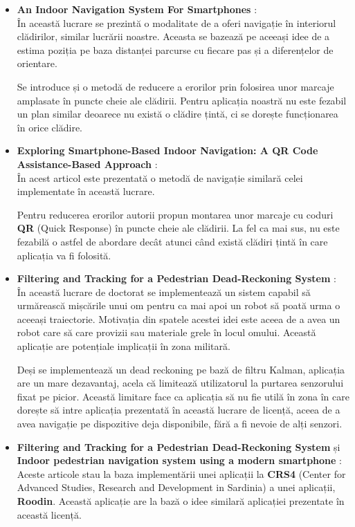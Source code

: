 \documentclass[12pt,a4paper]{article}
\begin{document}
\begin{itemize}
\item \textbf{An Indoor Navigation System For Smartphones} \cite{AbhijitChandgadkar}:\\
În această lucrare se prezintă o modalitate de a oferi navigație în interiorul clădirilor, similar lucrării noastre. Aceasta se bazează pe aceeași idee de a estima poziția pe baza distanței parcurse cu fiecare pas și a diferențelor de orientare. 

Se introduce și o metodă de reducere a erorilor prin folosirea unor marcaje amplasate în puncte cheie ale clădirii. Pentru aplicația noastră nu este fezabil un plan similar deoarece nu există o clădire țintă, ci se dorește funcționarea în orice clădire.

\item \textbf{Exploring Smartphone-Based Indoor Navigation: A QR Code Assistance-Based Approach} \cite{QRNavigation}:\\
În acest articol este prezentată o metodă de navigație similară celei implementate în această lucrare. 

Pentru reducerea erorilor autorii propun montarea unor marcaje cu coduri \textbf{QR} (Quick Response) în puncte cheie ale clădirii. La fel ca mai sus, nu este fezabilă o astfel de abordare decât atunci când există clădiri țintă în care aplicația va fi folosită.

\item \textbf{Filtering and Tracking for a Pedestrian Dead-Reckoning System} \cite{SuratKwanmuang}:\\
În această lucrare de doctorat se implementează un sistem capabil să urmărească mișcările unui om pentru ca mai apoi un robot să poată urma o aceeași traiectorie. Motivația din spatele acestei idei este aceea de a avea un robot care să care provizii sau materiale grele în locul omului. Această aplicație are potențiale implicații în zona militară.

Deși se implementează un dead reckoning pe bază de filtru Kalman, aplicația are un mare dezavantaj, acela că limitează utilizatorul la purtarea senzorului fixat pe picior. Această limitare face ca aplicația să nu fie utilă în zona în care dorește să intre aplicația prezentată în această lucrare de licență, aceea de a avea navigație pe dispozitive deja disponibile, fără a fi nevoie de alți senzori.

\item \textbf{Filtering and Tracking for a Pedestrian Dead-Reckoning System} \cite{SDCPA10b} și \textbf{Indoor pedestrian navigation system using a modern smartphone} \cite{SCM10}:\\
Aceste articole stau la baza implementării unei aplicații la \textbf{CRS4} (Center for Advanced Studies, Research and Development in Sardinia) a unei aplicații, \textbf{Roodin}. Această aplicație are la bază o idee similară aplicației prezentate în această licență.


\end{itemize}
\end{document}
